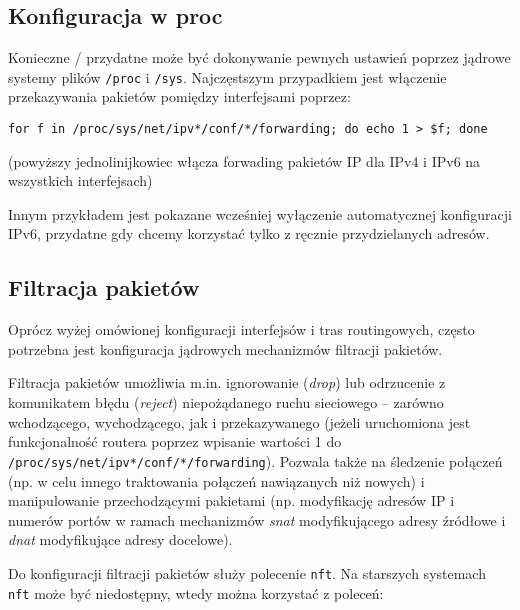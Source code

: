 \subsection{Konfiguracja w proc}

Konieczne / przydatne może być dokonywanie pewnych ustawień poprzez jądrowe systemy plików \Verb$/proc$ i \Verb$/sys$.
Najczęstszym przypadkiem jest włączenie przekazywania pakietów pomiędzy interfejsami poprzez:

\begin{verbatim}
for f in /proc/sys/net/ipv*/conf/*/forwarding; do echo 1 > $f; done
\end{verbatim}
(powyższy jednolinijkowiec włącza forwading pakietów IP dla IPv4 i IPv6 na wszystkich interfejsach)

Innym przykładem jest pokazane wcześniej wyłączenie automatycznej konfiguracji IPv6, przydatne gdy chcemy korzystać tylko z ręcznie przydzielanych adresów.


\subsection{Filtracja pakietów}

Oprócz wyżej omówionej konfiguracji interfejsów i tras routingowych, często potrzebna jest konfiguracja jądrowych mechanizmów filtracji pakietów.

Filtracja pakietów umożliwia m.in. ignorowanie (\textit{drop}) lub odrzucenie z komunikatem błędu (\textit{reject}) niepożądanego ruchu sieciowego
	– zarówno wchodzącego, wychodzącego, jak i przekazywanego (jeżeli uruchomiona jest funkcjonalność routera poprzez wpisanie wartości 1 do \Verb$/proc/sys/net/ipv*/conf/*/forwarding$).
Pozwala także na śledzenie połączeń (np. w celu innego traktowania połączeń nawiązanych niż nowych)
	i manipulowanie przechodzącymi pakietami (np. modyfikację adresów IP i numerów portów w ramach mechanizmów \textit{snat} modyfikującego adresy źródłowe i \textit{dnat} modyfikujące adresy docelowe).

Do konfiguracji filtracji pakietów służy polecenie \Verb#nft#.
Na starszych systemach \Verb#nft# może być niedostępny, wtedy można korzystać z poleceń:
